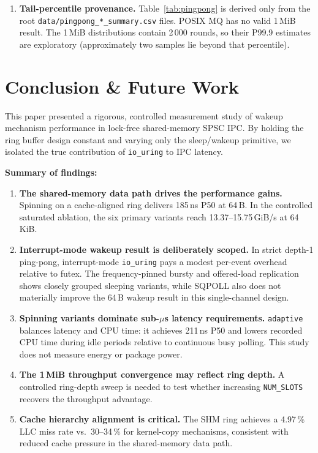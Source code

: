 \documentclass[10pt,conference]{IEEEtran}
\begin{document}
\begin{enumerate}
  \item \textbf{Tail-percentile provenance.}  Table~\ref{tab:pingpong} is
        derived only from the root \texttt{data/pingpong\_*\_summary.csv}
        files.  POSIX MQ has no valid 1\,MiB result.  The 1\,MiB
        distributions contain 2\,000 rounds, so their P99.9 estimates are
        exploratory (approximately two samples lie beyond that percentile).
\end{enumerate}

\section{Conclusion \& Future Work}

This paper presented a rigorous, controlled measurement study of wakeup
mechanism performance in lock-free shared-memory SPSC IPC.  By holding the
ring buffer design constant and varying only the sleep/wakeup primitive,
we isolated the true contribution of \texttt{io\_uring} to IPC latency.

\textbf{Summary of findings:}

\begin{enumerate}
  \item \textbf{The shared-memory data path drives the performance gains.}
        Spinning on a cache-aligned ring delivers 185\,ns P50 at 64\,B.
        In the controlled saturated ablation, the six primary variants reach
        13.37--15.75\,GiB/s at 64\,KiB.

  \item \textbf{Interrupt-mode wakeup result is deliberately scoped.}
        In strict depth-1 ping-pong, interrupt-mode \texttt{io\_uring} pays a
        modest per-event overhead relative to futex.  The frequency-pinned
        bursty and offered-load replication shows closely grouped sleeping
        variants, while SQPOLL also does not materially improve the 64\,B
        wakeup result in this single-channel design.

  \item \textbf{Spinning variants dominate sub-$\mu$s latency requirements.}
        \texttt{adaptive} balances latency and CPU time: it achieves 211\,ns
        P50 and lowers recorded CPU time during idle periods relative to
        continuous busy polling.
        This study does not measure energy or package power.

  \item \textbf{The 1\,MiB throughput convergence may reflect ring depth.}
        A controlled ring-depth sweep is needed to test whether increasing
        \texttt{NUM\_SLOTS} recovers the throughput advantage.

  \item \textbf{Cache hierarchy alignment is critical.}  The SHM ring achieves
        a 4.97\,\% LLC miss rate vs.\ 30--34\,\% for kernel-copy mechanisms,
        consistent with reduced cache pressure in the shared-memory data path.
\end{enumerate}
\end{document}
